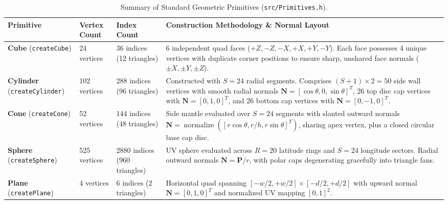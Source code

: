 \begin{table}[htbp]
\centering
\footnotesize
\renewcommand{\arraystretch}{0.92}
\begin{tabularx}{\textwidth}{p{2.5cm} p{2.2cm} p{2.2cm} p{7.5cm}}
\toprule
\textbf{Primitive} & \textbf{Vertex Count} & \textbf{Index Count} & \textbf{Construction Methodology \& Normal Layout} \\
\midrule
\textbf{Cube} \newline (\texttt{createCube}) &
24 vertices &
36 indices \newline (12 triangles) &
6 independent quad faces ($+Z, -Z, -X, +X, +Y, -Y$). Each face possesses 4 unique vertices with duplicate corner positions to ensure sharp, unshared face normals ($\pm X, \pm Y, \pm Z$). \\
\addlinespace
\textbf{Cylinder} \newline (\texttt{createCylinder}) &
102 vertices &
288 indices \newline (96 triangles) &
Constructed with $S = 24$ radial segments. Comprises $(S+1)\times 2 = 50$ side wall vertices with smooth radial normals $\mathbf{N} = [\cos\theta, 0, \sin\theta]^T$, 26 top disc cap vertices with $\mathbf{N} = [0, 1, 0]^T$, and 26 bottom cap vertices with $\mathbf{N} = [0, -1, 0]^T$. \\
\addlinespace
\textbf{Cone} \newline (\texttt{createCone}) &
52 vertices &
144 indices \newline (48 triangles) &
Side mantle evaluated over $S = 24$ segments with slanted outward normals $\mathbf{N} = \operatorname{normalize}([r\cos\theta, r/h, r\sin\theta]^T)$, sharing apex vertex, plus a closed circular base cap disc. \\
\addlinespace
\textbf{Sphere} \newline (\texttt{createSphere}) &
525 vertices &
2880 indices \newline (960 triangles) &
UV sphere evaluated across $R = 20$ latitude rings and $S = 24$ longitude sectors. Radial outward normals $\mathbf{N} = \mathbf{P} / r$, with polar caps degenerating gracefully into triangle fans. \\
\addlinespace
\textbf{Plane} \newline (\texttt{createPlane}) &
4 vertices &
6 indices \newline (2 triangles) &
Horizontal quad spanning $[-w/2, +w/2] \times [-d/2, +d/2]$ with upward normal $\mathbf{N} = [0, 1, 0]^T$ and normalized UV mapping $[0, 1]^2$. \\
\bottomrule
\end{tabularx}
\caption{Summary of Standard Geometric Primitives (\texttt{src/Primitives.h}).}
\label{tab:primitives_summary}
\end{table}

